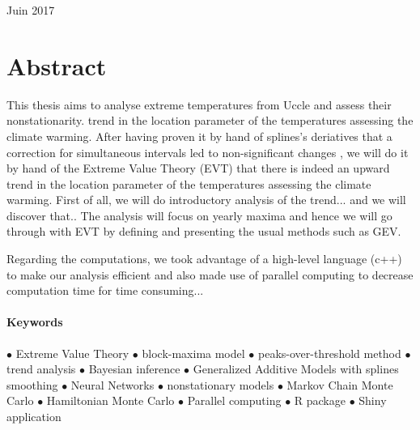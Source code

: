 \documentclass[11pt,a4paper,openany, twosided]{book}
\begin{document}
\vspace{1,5cm}



\begin{center}
	{\large Juin 2017}
\end{center}
\thispagestyle{empty}
\newpage


{}
\vspace*{\fill}
\section*{\centering Abstract}
\begin{tcolorbox}%
This thesis aims to analyse extreme temperatures from Uccle and assess their nonstationarity. trend in the location parameter of the temperatures assessing the climate warming.   
After having proven it by hand of splines's deriatives that a correction for simultaneous intervals led to non-significant changes , we will do it by hand of the Extreme Value Theory (EVT)  that there is indeed an upward trend in the location parameter of the temperatures assessing the climate warming. First of all, we will do introductory analysis of the trend... and we will discover that..  The analysis will focus on yearly maxima and hence we will go through with EVT by defining and presenting the usual methods such as GEV. 

Regarding the computations, we took advantage of a high-level language (c++) to make our analysis efficient and also made use of parallel computing to decrease computation time for time consuming...
\thispagestyle{empty}
\end{tcolorbox}

\vspace{.3cm}

\paragraph*{Keywords} $\bullet$ Extreme Value Theory   $\bullet$ block-maxima model  $\bullet$ peaks-over-threshold method $\bullet$ trend analysis $\bullet$ Bayesian inference   $\bullet$ Generalized Additive Models with splines smoothing  $\bullet$ Neural Networks  $\bullet$ nonstationary models $\bullet$ Markov Chain Monte Carlo $\bullet$ Hamiltonian Monte Carlo $\bullet$ Parallel computing $\bullet$ R package $\bullet$ Shiny application
\vspace*{\fill}
\end{document}

